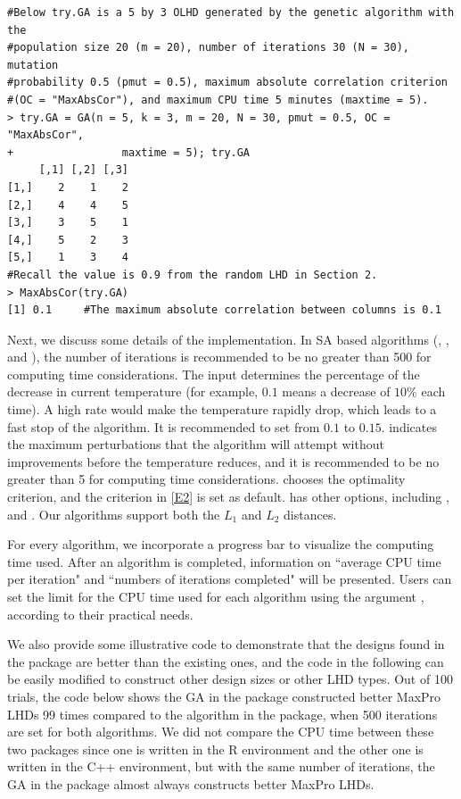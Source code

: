 {\begin{verbatim}
#Below try.GA is a 5 by 3 OLHD generated by the genetic algorithm with the
#population size 20 (m = 20), number of iterations 30 (N = 30),  mutation
#probability 0.5 (pmut = 0.5), maximum absolute correlation criterion
#(OC = "MaxAbsCor"), and maximum CPU time 5 minutes (maxtime = 5).
> try.GA = GA(n = 5, k = 3, m = 20, N = 30, pmut = 0.5, OC = "MaxAbsCor",
+                 maxtime = 5); try.GA
     [,1] [,2] [,3]
[1,]    2    1    2
[2,]    4    4    5
[3,]    3    5    1
[4,]    5    2    3
[5,]    1    3    4
#Recall the value is 0.9 from the random LHD in Section 2.
> MaxAbsCor(try.GA)
[1] 0.1     #The maximum absolute correlation between columns is 0.1
	\end{verbatim}
}

Next, we discuss some details of the implementation. In SA based algorithms (, , and ), the number of iterations  is recommended to be no greater than 500 for computing time considerations. The input  determines the percentage of the decrease in current temperature (for example, $0.1$ means a decrease of $10\%$ each time). A high rate would make the temperature rapidly drop, which leads to a fast stop of the algorithm. It is recommended to set  from $0.1$ to $0.15$.  indicates the maximum perturbations that the algorithm will attempt without improvements before the temperature reduces, and it is recommended to be no greater than 5 for computing time considerations.  chooses the optimality criterion, and the  criterion in \eqref{E2} is set as default.  has other options, including ,   and . Our algorithms support both the $L_1$ and $L_2$ distances.

For every algorithm, we incorporate a progress bar to visualize the computing time used. After an algorithm is completed, information on ``average CPU time per iteration" and ``numbers of iterations completed" will be presented. Users can set the limit for the CPU time used for each algorithm using the argument , according to their practical needs.

We also provide some illustrative code to demonstrate that the designs found in the  package are better than the existing ones, and the code in the following can be easily modified to construct other design sizes or other LHD types. Out of 100 trials, the code below shows the GA in the  package constructed better MaxPro LHDs 99 times compared to the algorithm in the  package, when 500 iterations are set for both algorithms. We did not compare the CPU time between these two packages since one is written in the R environment and the other one is written in the C++ environment, but with the same number of iterations, the GA in the  package almost always constructs better MaxPro LHDs.

